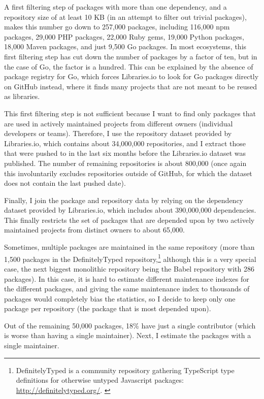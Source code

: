 A first filtering step of packages with more than one dependency, and a repository size of at least 10 KB (in an attempt to filter out trivial packages), makes this number go down to 257,000 packages, including 116,000 npm packages, 29,000 PHP packages, 22,000 Ruby gems, 19,000 Python packages, 18,000 Maven packages, and just 9,500 Go packages.
In most ecosystems, this first filtering step has cut down the number of packages by a factor of ten, but in the case of Go, the factor is a hundred.
This can be explained by the absence of package registry for Go, which forces Libraries.io to look for Go packages directly on GitHub instead, where it finds many projects that are not meant to be reused as libraries.

This first filtering step is not sufficient because I want to find only packages that are used in actively maintained projects from different owners (individual developers or teams).
Therefore, I use the repository dataset provided by Libraries.io, which contains about 34,000,000 repositories, and I extract those that were pushed to in the last six months before the Libraries.io dataset was published.
The number of remaining repositories is about 800,000 (once again this involuntarily excludes repositories outside of GitHub, for which the dataset does not contain the last pushed date).

Finally, I join the package and repository data by relying on the dependency dataset provided by Libraries.io, which includes about 390,000,000 dependencies.
This finally restricts the set of packages that are depended upon by two actively maintained projects from distinct owners to about 65,000.

Sometimes, multiple packages are maintained in the same repository (more than 1,500 packages in the DefinitelyTyped repository,\footnote{
	DefinitelyTyped is a community repository gathering TypeScript type definitions for otherwise untyped Javascript packages:
	\url{http://definitelytyped.org/}.
	\label{footnote:definitelytyped}
} although this is a very special case, the next biggest monolithic repository being the Babel repository with 286 packages).
In this case, it is hard to estimate different maintenance indexes for the different packages, and giving the same maintenance index to thousands of packages would completely bias the statistics, so I decide to keep only one package per repository (the package that is most depended upon).

Out of the remaining 50,000 packages, 18\% have just a single contributor (which is worse than having a single maintainer).
Next, I estimate the packages with a single maintainer.

